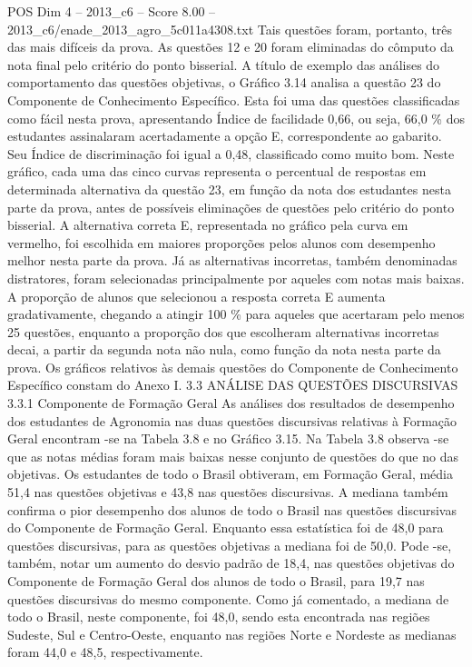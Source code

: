 \begin{textsample}{POS Dim 4 – 2013\_c6 – Score 8.00 – 2013\_c6/enade\_2013\_agro\_5c011a4308.txt}
Tais questões foram, portanto, três das mais difíceis da prova.
As questões 12 e 20 foram eliminadas do cômputo da nota final pelo critério do ponto bisserial.
A título de exemplo das análises do comportamento das questões objetivas, o Gráfico 3.14 analisa a questão 23 do Componente de Conhecimento Específico.
Esta foi uma das questões classificadas como fácil nesta prova, apresentando Índice de facilidade 0,66, ou seja, 66,0 \% dos estudantes assinalaram acertadamente a opção E, correspondente ao gabarito.
Seu Índice de discriminação foi igual a 0,48, classificado como muito bom.
Neste gráfico, cada uma das cinco curvas representa o percentual de respostas em determinada alternativa da questão 23, em função da nota dos estudantes nesta parte da prova, antes de possíveis eliminações de questões pelo critério do ponto bisserial.
A alternativa correta E, representada no gráfico pela curva em vermelho, foi escolhida em maiores proporções pelos alunos com desempenho melhor nesta parte da prova.
Já as alternativas incorretas, também denominadas distratores, foram selecionadas principalmente por aqueles com notas mais baixas.
A proporção de alunos que selecionou a resposta correta E aumenta gradativamente, chegando a atingir 100 \% para aqueles que acertaram pelo menos 25 questões, enquanto a proporção dos que escolheram alternativas incorretas decai, a partir da segunda nota não nula, como função da nota nesta parte da prova.
Os gráficos relativos às demais questões do Componente de Conhecimento Específico constam do Anexo I. 3.3 ANÁLISE DAS QUESTÕES DISCURSIVAS 3.3.1 Componente de Formação Geral As análises dos resultados de desempenho dos estudantes de Agronomia nas duas questões discursivas relativas à Formação Geral encontram -se na Tabela 3.8 e no Gráfico 3.15.
Na Tabela 3.8 observa -se que as notas médias foram mais baixas nesse conjunto de questões do que no das objetivas.
Os estudantes de todo o Brasil obtiveram, em Formação Geral, média 51,4 nas questões objetivas e 43,8 nas questões discursivas.
A mediana também confirma o pior desempenho dos alunos de todo o Brasil nas questões discursivas do Componente de Formação Geral.
Enquanto essa estatística foi de 48,0 para questões discursivas, para as questões objetivas a mediana foi de 50,0.
Pode -se, também, notar um aumento do desvio padrão de 18,4, nas questões objetivas do Componente de Formação Geral dos alunos de todo o Brasil, para 19,7 nas questões discursivas do mesmo componente.
Como já comentado, a mediana de todo o Brasil, neste componente, foi 48,0, sendo esta encontrada nas regiões Sudeste, Sul e Centro-Oeste, enquanto nas regiões Norte e Nordeste as medianas foram 44,0 e 48,5, respectivamente.

\end{textsample}

